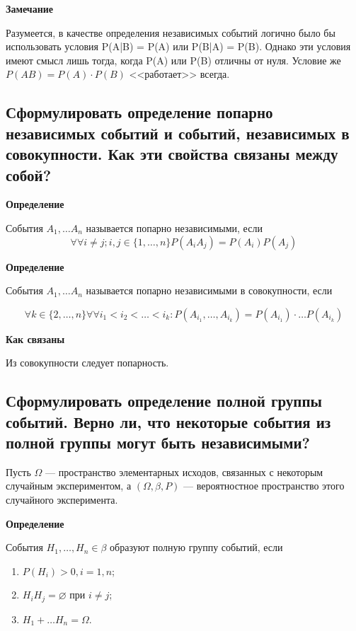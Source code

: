 \textbf{Замечание}

Разумеется, в качестве определения независимых событий логично было бы использовать условия P(A|B) = P(A) или P(B|A) = P(B). Однако эти условия имеют смысл лишь тогда, когда P(A) или P(B) отличны от нуля. Условие же $P(AB) = P(A) \cdot P(B)$ <<работает>> всегда.

\subsection{Сформулировать определение попарно независимых событий и событий, независимых в совокупности. Как эти свойства связаны между собой?}

\textbf{Определение}

События $A_1, \dots A_n$ называется попарно независимыми, если
\begin{equation}
	\forall \forall i \neq j; i,j \in \{1, \dots, n\} P(A_i A_j) = P(A_i)P(A_j)
\end{equation}


\textbf{Определение}

События $A_1, \dots A_n$ называется попарно независимыми в совокупности, если

\begin{equation}
	\forall k \in \{2, \dots, n\} \forall \forall i_1 < i_2 < \dots < i_k: P(A_{i_1}, \dots, A_{i_k}) = P(A_{i_1}) \cdot \dots P(A_{i_k})
\end{equation}

\textbf{Как связаны}

Из совокупности следует попарность.


\subsection{Сформулировать определение полной группы событий. Верно ли, что некоторые события из полной группы могут быть независимыми?}

Пусть $\Omega$ --- пространство элементарных исходов, связанных с некоторым случайным экспериментом, а $(\Omega, \beta, P)$ --- вероятностное пространство этого случайного эксперимента.

\textbf{Определение}

События $H_1, \dots, H_n \in \beta$ образуют полную группу событий, если

\begin{enumerate}
	\item $P(H_i) > 0, i = 1, n$;
	\item $H_iH_j = \varnothing$ при $i \neq j$;
	\item $H_1 + \dots H_n = \Omega$.
\end{enumerate}

